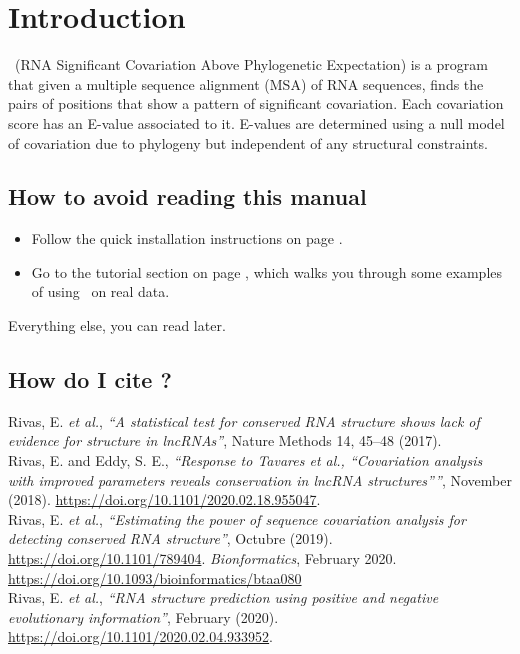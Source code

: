 \section{Introduction}
\setcounter{footnote}{0}

\rscape\ (RNA Significant Covariation Above Phylogenetic Expectation)
is a program that given a multiple sequence alignment (MSA) of RNA
sequences, finds the pairs of positions that show a pattern of
significant covariation. Each covariation score has an E-value
associated to it. E-values are determined using a null model of
covariation due to phylogeny but independent of any structural
constraints. 

\subsection{How to avoid reading this manual}

\begin{itemize}
\item Follow the quick installation instructions on page
      \pageref{section:installation}. 
\item Go to the tutorial section on page
\pageref{section:tutorial}, which walks you through some examples of
using \rscape\ on real data.
\end{itemize}

Everything else, you can read later.



\subsection{How do I cite \rscape?}

Rivas, E. \textit{et al.}, \textit{``A statistical test for conserved
  RNA structure shows lack of evidence for structure in lncRNAs''},
Nature Methods 14, 45–48 (2017).\\

\noindent
Rivas, E. and Eddy, S. E., \textit{``Response to Tavares et al.,
  “Covariation analysis with improved parameters reveals conservation
  in lncRNA structures”''}, November (2018).  \url{https://doi.org/10.1101/2020.02.18.955047}.\\

\noindent
Rivas, E. \textit{et al.}, \textit{``Estimating the power of sequence
  covariation analysis for detecting conserved RNA structure''},
Octubre (2019). \url{https://doi.org/10.1101/789404}.
\textit{Bionformatics}, February 2020.
\url{https://doi.org/10.1093/bioinformatics/btaa080}\\

\noindent
Rivas, E. \textit{et al.}, \textit{``RNA structure prediction using
  positive and negative evolutionary information''},
February (2020).
\url{https://doi.org/10.1101/2020.02.04.933952}.\\











  









